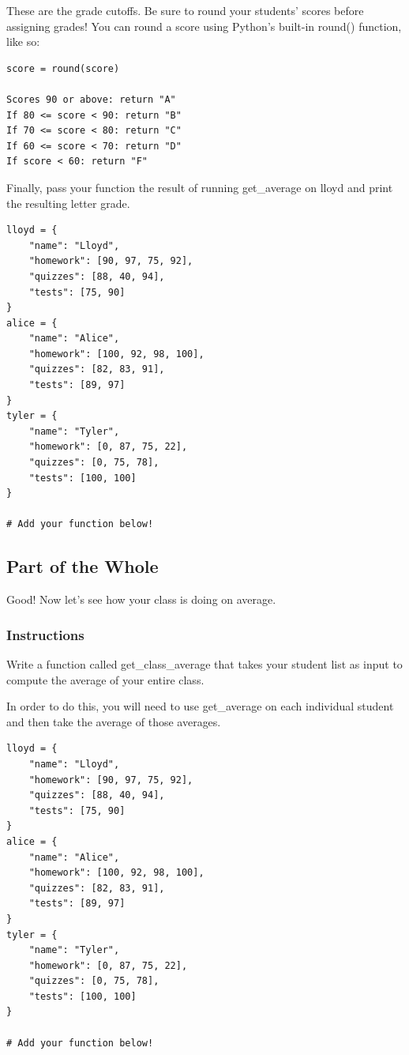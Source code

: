 \documentclass[12pt,a4paper,final,twoside,onecolumn,titlepage]{book}
\begin{document}
These are the grade cutoffs. Be sure to round your students' scores before assigning grades! You can round a score using Python's built-in round() function, like so:
\begin{lstlisting}
score = round(score)

Scores 90 or above: return "A"
If 80 <= score < 90: return "B"
If 70 <= score < 80: return "C"
If 60 <= score < 70: return "D"
If score < 60: return "F"
\end{lstlisting}
Finally, pass your function the result of running get\_average on lloyd and print the resulting letter grade.
\begin{lstlisting}
lloyd = {
    "name": "Lloyd",
    "homework": [90, 97, 75, 92],
    "quizzes": [88, 40, 94],
    "tests": [75, 90]
}
alice = {
    "name": "Alice",
    "homework": [100, 92, 98, 100],
    "quizzes": [82, 83, 91],
    "tests": [89, 97]
}
tyler = {
    "name": "Tyler",
    "homework": [0, 87, 75, 22],
    "quizzes": [0, 75, 78],
    "tests": [100, 100]
}

# Add your function below!

\end{lstlisting}

\subsection{Part of the Whole}

Good! Now let's see how your class is doing on average.
\subsubsection{Instructions}

Write a function called get\_class\_average that takes your student list as input to compute the average of your entire class.

In order to do this, you will need to use get\_average on each individual student and then take the average of those averages.
\begin{lstlisting}
lloyd = {
    "name": "Lloyd",
    "homework": [90, 97, 75, 92],
    "quizzes": [88, 40, 94],
    "tests": [75, 90]
}
alice = {
    "name": "Alice",
    "homework": [100, 92, 98, 100],
    "quizzes": [82, 83, 91],
    "tests": [89, 97]
}
tyler = {
    "name": "Tyler",
    "homework": [0, 87, 75, 22],
    "quizzes": [0, 75, 78],
    "tests": [100, 100]
}

# Add your function below!

\end{lstlisting}
\end{document}
